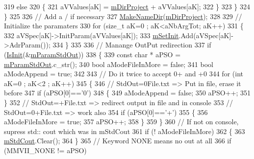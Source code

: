 \begin{DoxyCode}
319         \textcolor{keywordflow}{else}
320         \{
321            aVValues[aK] = \hyperlink{classMMVII_1_1cMMVII__Appli_ac499a1136b5261fb82e1ac0fb9632fdc}{mDirProject} + aVValues[aK];
322         \}
323      \}
324   \}
325 
326   \textcolor{comment}{// Add a / if necessary}
327   \hyperlink{uti__string_8cpp_a2ba1810dc4ff3d1e00bede52d97a5f6b}{MakeNameDir}(\hyperlink{classMMVII_1_1cMMVII__Appli_ac499a1136b5261fb82e1ac0fb9632fdc}{mDirProject});
328 
329   \textcolor{comment}{//  Initialize the paramaters}
330   \textcolor{keywordflow}{for} (\textcolor{keywordtype}{size\_t} aK=0 ; aK<aNbArgTot; aK++)
331   \{
332        aVSpec[aK]->InitParam(aVValues[aK]);
333        \hyperlink{classMMVII_1_1cMMVII__Appli_a65f9c8e17c158abfbb12d86988fb9a63}{mSetInit}.Add(aVSpec[aK]->AdrParam()); 
334   \}
335 
336   \textcolor{comment}{// Manange OutPut redirection}
337   \textcolor{keywordflow}{if} (\hyperlink{classMMVII_1_1cMMVII__Appli_a3363a4afe1f4f43e28df0799ab31149a}{IsInit}(&\hyperlink{classMMVII_1_1cMMVII__Appli_a4271799db9866d8ed5b194e2022633d0}{mParamStdOut}))
338   \{
339      \textcolor{keyword}{const} \textcolor{keywordtype}{char} * aPSO = \hyperlink{classMMVII_1_1cMMVII__Appli_a4271799db9866d8ed5b194e2022633d0}{mParamStdOut}.c\_str();
340      \textcolor{keywordtype}{bool} aModeFileInMore = \textcolor{keyword}{false};
341      \textcolor{keywordtype}{bool} aModeAppend = \textcolor{keyword}{true};
342 
343      \textcolor{comment}{// Do it twice to accept 0+ and +0}
344      \textcolor{keywordflow}{for} (\textcolor{keywordtype}{int} aK=0 ; aK<2 ; aK++)
345      \{
346          \textcolor{comment}{//  StdOut=0File.txt => Put in file, erase it before}
347          \textcolor{keywordflow}{if} (aPSO[0]==\textcolor{charliteral}{'0'})
348          \{
349             aModeAppend = \textcolor{keyword}{false};
350             aPSO++;  
351          \}
352          \textcolor{comment}{//  StdOut=+File.txt => redirect output in file and in console}
353          \textcolor{comment}{//  StdOut=0+File.txt => work also}
354          \textcolor{keywordflow}{if} (aPSO[0]==\textcolor{charliteral}{'+'})
355          \{
356             aModeFileInMore = \textcolor{keyword}{true};
357             aPSO++;  
358          \}
359      \}
360      \textcolor{comment}{// If not on console, supress std:: cout which was in mStdCout}
361      \textcolor{keywordflow}{if} (! aModeFileInMore)
362      \{
363          \hyperlink{classMMVII_1_1cMMVII__Appli_ab9332c2d0457538973077e9e2dca3609}{mStdCout}.Clear();
364      \}
365      \textcolor{comment}{// Keyword NONE means no out at all}
366      \textcolor{keywordflow}{if} (MMVII\_NONE != aPSO)

\end{DoxyCode}
